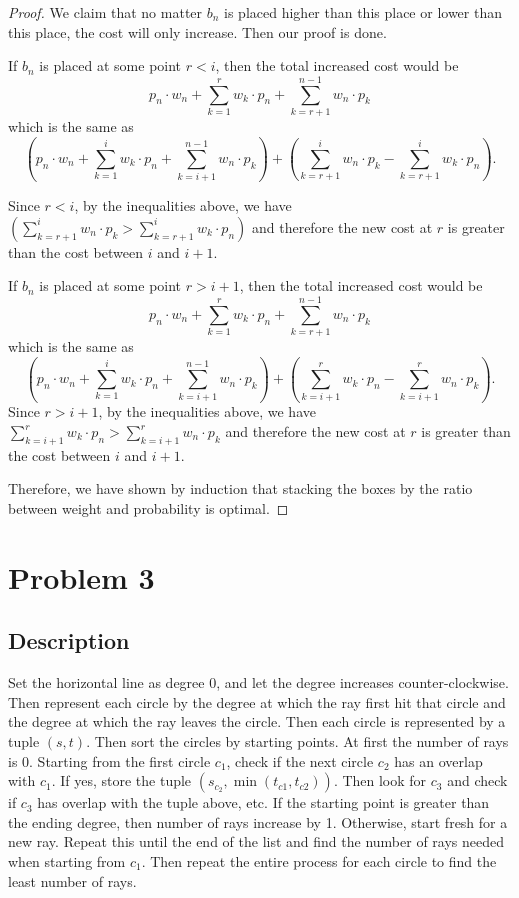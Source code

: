 \documentclass[11pt, oneside]{article}   	%
\begin{document}
\begin{proof}
We claim that no matter $b_n$ is placed higher than this place or lower than this place, the cost will only increase. Then our proof is done.

If $b_n$ is placed at some point $r<i$, then the total increased cost would be 
$$p_n \cdot w_n + \sum_{k = 1}^r w_k \cdot p_n + \sum_{k = r+1}^{n-1}w_n \cdot p_k$$ which is the same as
$$(p_n\cdot w_n + \sum_{k = 1}^i w_k \cdot p_n + \sum_{k = i+1}^{n-1}w_n \cdot p_k) + (\sum_{k = r+1}^i w_n \cdot p_k - \sum_{k = r+1}^i w_k \cdot p_n).$$

Since $r<i$, by the inequalities above, we have $(\sum_{k = r+1}^i w_n \cdot p_k > \sum_{k = r+1}^i w_k \cdot p_n)$ and therefore the new cost at $r$ is greater than the cost between $i$ and $i+1$.

If $b_n$ is placed at some point $r>i+1$, then the total increased cost would be $$p_n \cdot w_n + \sum_{k = 1}^r w_k \cdot p_n + \sum_{k = r+1}^{n-1}w_n \cdot p_k$$ which is the same as $$(p_n\cdot w_n + \sum_{k = 1}^i w_k \cdot p_n + \sum_{k = i+1}^{n-1}w_n \cdot p_k) + (\sum_{k = i+1}^r w_k \cdot p_n - \sum_{k = i+1}^r w_n \cdot p_k).$$
Since $r>i+1$, by the inequalities above, we have $\sum_{k = i+1}^r w_k \cdot p_n > \sum_{k = i+1}^r w_n \cdot p_k$ and therefore the new cost at $r$ is greater than the cost between $i$ and $i+1$.

Therefore, we have shown by induction that stacking the boxes by the ratio between weight and probability is optimal.
\end{proof}
\section{Problem 3}
\subsection{Description}
Set the horizontal line as degree 0, and let the degree increases counter-clockwise. Then represent each circle by the degree at which the ray first hit that circle and the degree at which the ray leaves the circle. Then each circle is represented by a tuple $(s,t)$. Then sort the circles by starting points. At first the number of rays is 0. Starting from the first circle $c_1$, check if the next circle $c_2$ has an overlap with $c_1$. If yes, store the tuple $(s_{c_2}, \min(t_{c1},t_{c2}))$. Then look for $c_3$ and check if $c_3$ has overlap with the tuple above, etc. If the starting point is greater than the ending degree, then number of rays increase by 1. Otherwise, start fresh for a new ray. Repeat this until the end of the list and find the number of rays needed when starting from $c_1$. Then repeat the entire process for each circle to find the least number of rays.
\newpage
\end{document}
